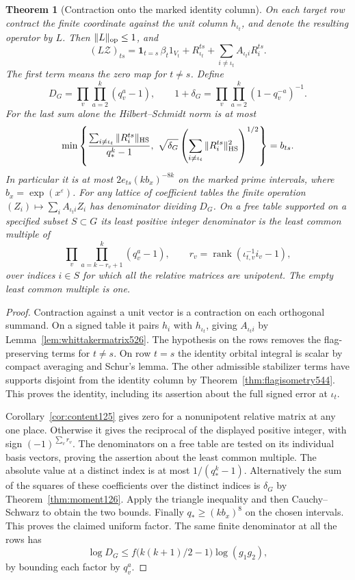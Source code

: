 \documentclass[a4paper,11pt]{article}
\newtheorem{theorem}[proposition]{Theorem}
\theoremstyle{definition}
\theoremstyle{remark}
\numberwithin{equation}{section}
\begin{document}
\begin{theorem}[Contraction onto the marked identity column]
\leavevmode\label{thm:identitycoefficient551}
On each target row contract the finite coordinate against the unit
column \(h_{\iota_t}\), and denote the resulting operator by \(L\).
Then \(\|L\|_{\rm op}\le1\), and
\[
 (L\mathcal Z)_{ts}=\mathbf1_{t=s}\,\beta_t1_{V_t}
                +R_{\iota_t}^{ts}
                +\sum_{i\ne\iota_t}A_{\iota_t i}R_i^{ts}.
\]
The first term means the zero map for \(t\ne s\). Define
\[
 D_G=\prod_v\prod_{a=2}^{k}(q_v^a-1),\qquad
 1+\delta_G=\prod_v\prod_{a=2}^k(1-q_v^{-a})^{-1}.
\]
For the last sum alone the Hilbert--Schmidt norm is at most
\[
 \min\left\{\frac{\sum_{i\ne\iota_t}\|R_i^{ts}\|_{\rm HS}}{q_*^k-1},
       \ \sqrt{\delta_G}
       \left(\sum_{i\ne\iota_t}\|R_i^{ts}\|_{\rm HS}^2\right)^{1/2}
       \right\}=b_{ts}.
\]
In particular it is at most \(2e_{ts}(k b_x)^{-8k}\) on the
marked prime intervals, where \(b_x=\exp(x^\varepsilon)\).
For any lattice of coefficient tables the finite operation
\((Z_i)\mapsto\sum_i A_{\iota_t i}Z_i\) has denominator dividing
\(D_G\). On a free table supported on a specified subset \(S\subset G\)
its least positive integer denominator is the least common multiple
of
\[
     \prod_v\prod_{a=k-r_v+1}^k(q_v^a-1),\qquad
     r_v=\operatorname{rank}(\iota_{t,v}^{-1}i_v-1),
\]
over indices \(i\in S\) for which all the relative matrices are
unipotent. The empty least common multiple is one.
\end{theorem}
\begin{proof}
Contraction against a unit vector is a contraction on each
orthogonal summand. On a signed table it pairs \(h_i\) with
\(h_{\iota_t}\), giving \(A_{\iota_t i}\) by
Lemma~\ref{lem:whittakermatrix526}. The hypothesis on the rows
removes the flag-preserving terms for \(t\ne s\). On row \(t=s\)
the identity orbital integral is scalar by compact averaging
and Schur's lemma. The other admissible stabilizer terms have
supports disjoint from the identity column by
Theorem~\ref{thm:flagisometry544}. This proves the identity,
including its assertion about the full signed error at \(\iota_t\).

Corollary~\ref{cor:content125} gives zero for a nonunipotent
relative matrix at any one place. Otherwise it gives the
reciprocal of the displayed positive integer, with sign
\((-1)^{\sum_v r_v}\). The denominators on a free table are
tested on its individual basis vectors, proving the assertion
about the least common multiple. The absolute value at a distinct
index is at most \(1/(q_*^k-1)\). Alternatively the sum of the
squares of these coefficients over the distinct indices is
\(\delta_G\) by Theorem~\ref{thm:moment126}. Apply the triangle
inequality and then Cauchy--Schwarz to obtain the two bounds.
Finally \(q_*\ge(kb_x)^8\) on the chosen intervals. This proves
the claimed uniform factor. The same finite denominator at all
the rows has
\[
   \log D_G\le f\bigl(k(k+1)/2-1\bigr)\log(g_1g_2),
\]
by bounding each factor by \(q_v^a\).
\end{proof}
\end{document}
